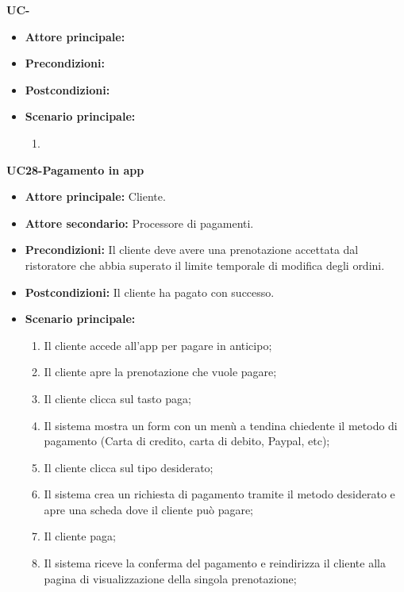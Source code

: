 \textbf{UC-}
\begin{itemize}
\item \textbf{Attore principale:}
\item \textbf{Precondizioni:}
\item \textbf{Postcondizioni:}
\item \textbf{Scenario principale:}
\begin{enumerate}
    \item
\end{enumerate}
\end{itemize}

\textbf{UC28-Pagamento in app}
\begin{itemize}
\item \textbf{Attore principale:} Cliente.
\item \textbf{Attore secondario:} Processore di pagamenti.
\item \textbf{Precondizioni:} Il cliente deve avere una prenotazione accettata dal ristoratore che abbia superato il
  limite temporale di modifica degli ordini.
\item \textbf{Postcondizioni:} Il cliente ha pagato con successo.
\item \textbf{Scenario principale:}
\begin{enumerate}
    \item Il cliente accede all'app per pagare in anticipo;
    \item Il cliente apre la prenotazione che vuole pagare;
    \item Il cliente clicca sul tasto paga;
    \item Il sistema mostra un form con un menù a tendina chiedente il metodo di pagamento
      (Carta di credito, carta di debito, Paypal, etc);
    \item Il cliente clicca sul tipo desiderato;
    \item Il sistema crea un richiesta di pagamento tramite il metodo desiderato e 
      apre una scheda dove il cliente può pagare;
    \item Il cliente paga;
    \item Il sistema riceve la conferma del pagamento e reindirizza il cliente alla pagina di visualizzazione della singola prenotazione;
\end{enumerate}
\end{itemize}

